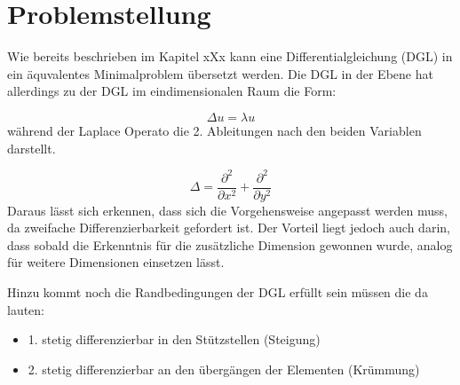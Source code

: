 %
%
%
\section{Problemstellung
\label{fem:section:problemstellung}}

Wie bereits beschrieben im Kapitel xXx kann eine Differentialgleichung (DGL) in ein äquvalentes Minimalproblem übersetzt werden. Die DGL in der Ebene hat allerdings zu der DGL im eindimensionalen Raum die Form:

\begin{equation}
	\Delta u = \lambda u
	\label{fem:DGL2D}
\end{equation} 
während der Laplace Operato die 2. Ableitungen nach den beiden Variablen darstellt.

\begin{equation}
	\Delta = \frac{\partial ^2}{\partial x^2} + \frac{\partial ^2}{\partial y^2}
\end{equation} 
Daraus lässt sich erkennen, dass sich die Vorgehensweise angepasst werden muss, da zweifache Differenzierbarkeit gefordert ist. Der Vorteil liegt jedoch auch darin, dass sobald die Erkenntnis für die zusätzliche Dimension gewonnen wurde, analog für weitere Dimensionen einsetzen lässt.

Hinzu kommt noch die Randbedingungen der DGL erfüllt sein müssen die da lauten:
\begin{itemize}
	\item 1. stetig differenzierbar in den Stützstellen (Steigung)
	\item 2. stetig differenzierbar an den übergängen der Elementen (Krümmung)
\end{itemize}




